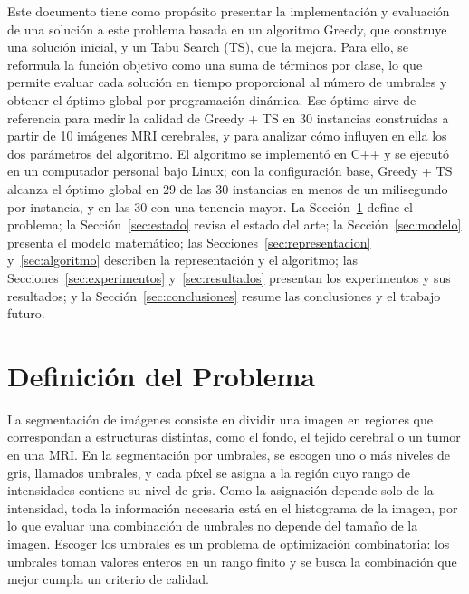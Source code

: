 \documentclass[letter, 10pt]{article}
\begin{document}
Este documento tiene como propósito presentar la implementación y evaluación de una solución a este problema basada en un algoritmo Greedy, que construye una solución inicial, y un Tabu Search (TS), que la mejora. Para ello, se reformula la función objetivo como una suma de términos por clase, lo que permite evaluar cada solución en tiempo proporcional al número de umbrales y obtener el óptimo global por programación dinámica. Ese óptimo sirve de referencia para medir la calidad de Greedy + TS en 30 instancias construidas a partir de 10 imágenes MRI cerebrales, y para analizar cómo influyen en ella los dos parámetros del algoritmo. El algoritmo se implementó en C++ y se ejecutó en un computador personal bajo Linux; con la configuración base, Greedy + TS alcanza el óptimo global en 29 de las 30 instancias en menos de un milisegundo por instancia, y en las 30 con una tenencia mayor. La Sección~\ref{sec:definicion} define el problema; la Sección~\ref{sec:estado} revisa el estado del arte; la Sección~\ref{sec:modelo} presenta el modelo matemático; las Secciones~\ref{sec:representacion} y~\ref{sec:algoritmo} describen la representación y el algoritmo; las Secciones~\ref{sec:experimentos} y~\ref{sec:resultados} presentan los experimentos y sus resultados; y la Sección~\ref{sec:conclusiones} resume las conclusiones y el trabajo futuro.

\section{Definici\'on del Problema}
\label{sec:definicion}
La segmentación de imágenes consiste en dividir una imagen en regiones que correspondan a estructuras distintas, como el fondo, el tejido cerebral o un tumor en una MRI. En la segmentación por umbrales, se escogen uno o más niveles de gris, llamados umbrales, y cada píxel se asigna a la región cuyo rango de intensidades contiene su nivel de gris. Como la asignación depende solo de la intensidad, toda la información necesaria está en el histograma de la imagen, por lo que evaluar una combinación de umbrales no depende del tamaño de la imagen. Escoger los umbrales es un problema de optimización combinatoria: los umbrales toman valores enteros en un rango finito y se busca la combinación que mejor cumpla un criterio de calidad.
\end{document}
